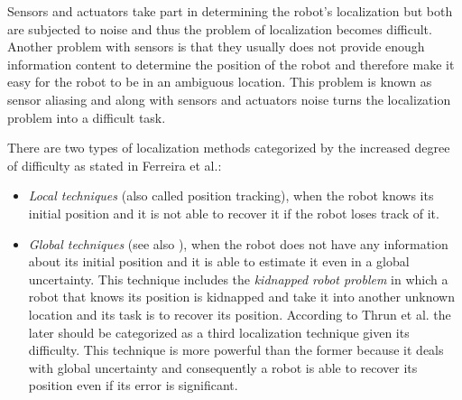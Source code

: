 Sensors and actuators take part in determining the robot's localization but both are subjected to noise and thus the problem of localization becomes difficult. Another problem with sensors is that they usually does not provide enough information content to determine the position of the robot and therefore make it easy for the robot to be in an ambiguous location. This problem is known as sensor aliasing and along with sensors and actuators noise turns the localization problem into a difficult task\cite{Siegwart:intro-autonumous-robots}.

There are two types of localization methods categorized by the increased degree of difficulty as stated in Ferreira et al.\cite{Ferreira:prob}: 

\begin{itemize}
\item \textit{Local techniques} (also called position tracking\cite{Thrun:2005:PR:1121596}), when the robot knows its initial position and it is not able to recover it if the robot loses track of it.
\item \textit{Global techniques} (see also \cite{Feng:where-am-I}), when the robot does not have any information about its initial position and it is able to estimate it even in a global uncertainty. This technique includes the \textit{kidnapped robot problem} in which a robot that knows its position is kidnapped and take it into another unknown location and its task is to recover its position. According to Thrun et al.\cite{Thrun:2005:PR:1121596} the later should be categorized as a third localization technique given its difficulty. This technique is more powerful than the former because it deals with global uncertainty and consequently a robot is able to recover its position even if its error is significant.
\end{itemize}

